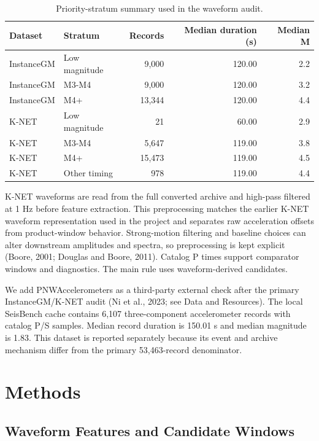 \documentclass[12pt,letterpaper]{article}
\begin{document}
\begin{table}[!htbp]
\centering
\caption{Priority-stratum summary used in the waveform audit.}
\label{tab:priority}
\begin{singlespace}
\footnotesize
\setlength{\tabcolsep}{3pt}
\begin{tabular*}{0.82\textwidth}{@{\extracolsep{\fill}}llrrr@{}}
\toprule
Dataset & Stratum & Records & Median duration (s) & Median M \\
\midrule
InstanceGM & Low magnitude & 9,000 & 120.00 & 2.2 \\
InstanceGM & M3-M4 & 9,000 & 120.00 & 3.2 \\
InstanceGM & M4+ & 13,344 & 120.00 & 4.4 \\
K-NET & Low magnitude & 21 & 60.00 & 2.9 \\
K-NET & M3-M4 & 5,647 & 119.00 & 3.8 \\
K-NET & M4+ & 15,473 & 119.00 & 4.5 \\
K-NET & Other timing & 978 & 119.00 & 4.4 \\
\bottomrule
\end{tabular*}
\end{singlespace}
\end{table}

K-NET waveforms are read from the full converted archive and high-pass filtered at 1 Hz before feature extraction. This preprocessing matches the earlier K-NET waveform representation used in the project and separates raw acceleration offsets from product-window behavior. Strong-motion filtering and baseline choices can alter downstream amplitudes and spectra, so preprocessing is kept explicit (Boore, 2001; Douglas and Boore, 2011). Catalog P times support comparator windows and diagnostics. The main rule uses waveform-derived candidates.

We add PNWAccelerometers as a third-party external check after the primary InstanceGM/K-NET audit (Ni et al., 2023; see Data and Resources). The local SeisBench cache contains 6,107 three-component accelerometer records with catalog P/S samples. Median record duration is 150.01 s and median magnitude is 1.83. This dataset is reported separately because its event and archive mechanism differ from the primary 53,463-record denominator.

\section{Methods}\label{methods}

\subsection{Waveform Features and Candidate Windows}\label{waveform-features-and-candidate-windows}
\end{document}
